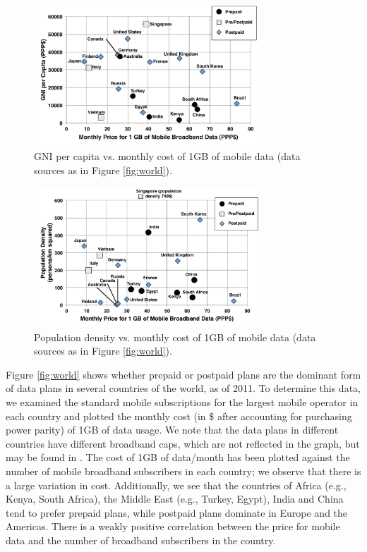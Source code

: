 \begin{figure}
\centering
\includegraphics[width=0.75\textwidth]{Figures/GNI.pdf}
\caption{GNI per capita vs. monthly cost of 1GB of mobile data (data sources as in Figure \ref{fig:world}).}
\label{fig:gni}
\end{figure}

\begin{figure}
\centering
\includegraphics[width=0.75\textwidth]{Figures/Density_PPP.pdf}
\caption{Population density vs. monthly cost of 1GB of mobile data (data sources as in Figure \ref{fig:world}).}
\label{fig:density}
\end{figure}

Figure \ref{fig:world} shows whether prepaid or postpaid plans are the dominant form of data plans in several countries of the world, as of 2011. To determine this data, we examined the standard mobile subscriptions for the largest mobile operator in each country and plotted the monthly cost (in \$ after accounting for purchasing power parity) of 1GB of data usage.  We note that the data plans in different countries have different broadband caps, which are not reflected in the graph, but may be found in \cite{itu}. The cost of 1GB of data/month has been plotted against the number of mobile broadband subscribers in each country; we observe that there is a large variation in cost. Additionally, we see that the countries of Africa (e.g., Kenya, South Africa), the Middle East (e.g., Turkey, Egypt), India and China tend to prefer prepaid plans, while postpaid plans dominate in Europe and the Americas. There is a weakly positive correlation between the price for mobile data and the number of broadband subscribers in the country.

